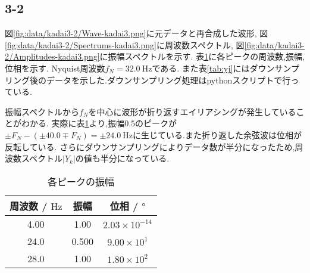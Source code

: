 \subsection*{3-2}
図\ref{fig:data/kadai3-2/Wave-kadai3.png}に元データと再合成した波形,
図\ref{fig:data/kadai3-2/Spectrums-kadai3.png}に周波数スペクトル,
図\ref{fig:data/kadai3-2/Amplitudes-kadai3.png}に振幅スペクトルを示す.
表\ref{tab:3-2}に各ピークの周波数,振幅,位相を示す.
Nyquist周波数$f_{N}=32.0\ \si{\hertz}$である.
また表\ref{tab:yj}にはダウンサンプリング後のデータを示した.ダウンサンプリング処理はpythonスクリプトで行っている.

振幅スペクトルから$f_N$を中心に波形が折り返すエイリアシングが発生していることがわかる.
実際に表\ref{tab:3-2}より,振幅$0.5$のピークが$\pm F_N-(\pm40.0\mp F_N)=\pm24.0\ \si{\hertz}$に生じている.また折り返した余弦波は位相が反転している.
さらにダウンサンプリングによりデータ数が半分になったため,周波数スペクトル$|Y_k|$の値も半分になっている.
\begin{table}[h]
\caption{各ピークの振幅}
\label{tab:3-2}
\centering
\begin{tabular}{ccc}
\hline
周波数 / $\si{\hertz}$ & 振幅  & 位相 / $\si{\degree}$ \\
\hline \hline
4.00&1.00&$2.03\times10^{-14}$\\
24.0&0.500&$9.00\times10^1$\\
28.0&1.00&$1.80\times10^2$\\
\hline
\end{tabular}
\end{table}